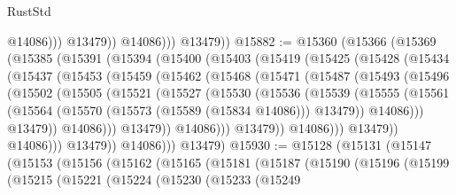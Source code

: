 \begin{lexlean}{RustStd}
\begin{coremodule}
                        @14086)))
                  @13479))
              @14086)))
        @13479))
@15882 := @15360
    (@15366
      (@15369
        (@15385
          (@15391
            (@15394
              (@15400
                (@15403
                  (@15419
                    (@15425
                      (@15428
                        (@15434
                          (@15437
                            (@15453
                              (@15459
                                (@15462
                                  (@15468
                                    (@15471
                                      (@15487
                                        (@15493
                                          (@15496
                                            (@15502
                                              (@15505
                                                (@15521
                                                  (@15527
                                                    (@15530
                                                      (@15536
                                                        (@15539
                                                          (@15555
                                                            (@15561
                                                              (@15564
                                                                (@15570
                                                                  (@15573 (@15589 (@15834 @14086)))
                                                                  @13479))
                                                              @14086)))
                                                        @13479))
                                                    @14086)))
                                              @13479))
                                          @14086)))
                                    @13479))
                                @14086)))
                          @13479))
                      @14086)))
                @13479))
            @14086)))
      @13479)
@15930 := @15128
    (@15131
      (@15147
        (@15153
          (@15156
            (@15162
              (@15165
                (@15181
                  (@15187
                    (@15190
                      (@15196
                        (@15199
                          (@15215
                            (@15221
                              (@15224
                                (@15230
                                  (@15233
                                    (@15249

\end{coremodule}
\end{lexlean}
